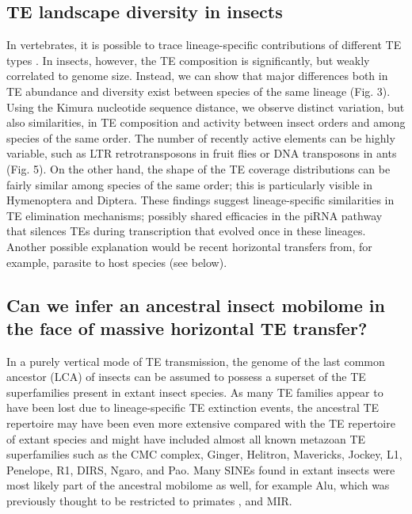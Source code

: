 \subsection{TE landscape diversity in
insects}\label{te-landscape-diversity-in-insects}

In vertebrates, it is possible to trace lineage-specific contributions
of different TE types \citep{Chalopin2015}. In insects, however, the TE
composition is significantly, but weakly correlated to genome size.
Instead, we can show that major differences both in TE abundance and
diversity exist between species of the same lineage (Fig. 3). Using the
Kimura nucleotide sequence distance, we observe distinct variation, but
also similarities, in TE composition and activity between insect orders
and among species of the same order. The number of recently active
elements can be highly variable, such as LTR retrotransposons in fruit
flies or DNA transposons in ants (Fig. 5). On the other hand, the shape
of the TE coverage distributions can be fairly similar among species of
the same order; this is particularly visible in Hymenoptera and Diptera.
These findings suggest lineage-specific similarities in TE elimination
mechanisms; possibly shared efficacies in the piRNA pathway that
silences TEs during transcription \citep{LeThomas2013} that evolved once
in these lineages. Another possible explanation would be recent
horizontal transfers from, for example, parasite to host species (see
below).

\subsection{Can we infer an ancestral insect mobilome in the face of
massive horizontal TE
transfer?}\label{can-we-infer-an-ancestral-insect-mobilome-in-the-face-of-massive-horizontal-te-transfer}

In a purely vertical mode of TE transmission, the genome of the last
common ancestor (LCA) of insects can be assumed to possess a superset of
the TE superfamilies present in extant insect species. As many TE
families appear to have been lost due to lineage-specific TE extinction
events, the ancestral TE repertoire may have been even more extensive
compared with the TE repertoire of extant species and might have
included almost all known metazoan TE superfamilies such as the CMC
complex, Ginger, Helitron, Mavericks, Jockey, L1, Penelope, R1, DIRS,
Ngaro, and Pao. Many SINEs found in extant insects were most likely part
of the ancestral mobilome as well, for example Alu, which was previously
thought to be restricted to primates \citep{Deininger_2011}, and MIR.


